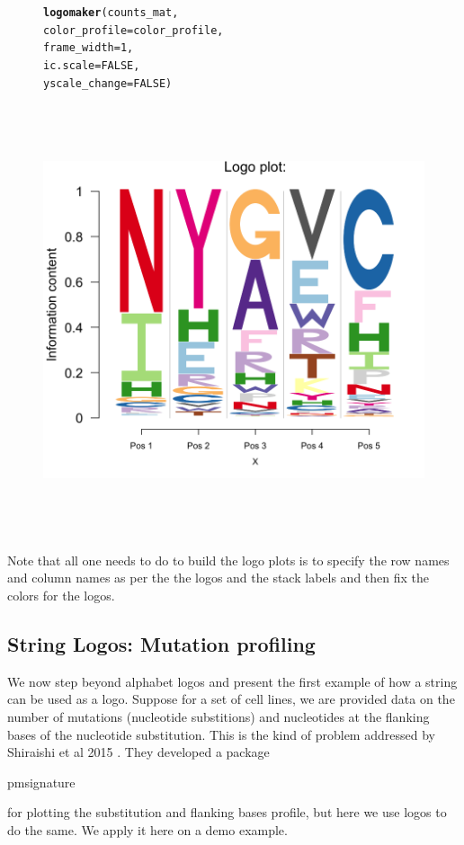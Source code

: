 \documentclass[12pt]{article}\usepackage[]{graphicx}\usepackage[usenames,dvipsnames]{color}
\makeatletter
\newcommand{\hlnum}[1]{\textcolor[rgb]{0.686,0.059,0.569}{#1}}%
\newcommand{\hlstd}[1]{\textcolor[rgb]{0.345,0.345,0.345}{#1}}%
\newcommand{\hlkwc}[1]{\textcolor[rgb]{0.333,0.667,0.333}{#1}}%
\newcommand{\hlkwd}[1]{\textcolor[rgb]{0.737,0.353,0.396}{\textbf{#1}}}%
\newenvironment{kframe}{%
 \def\at@end@of@kframe{}%
 \ifinner\ifhmode%
  \def\at@end@of@kframe{\end{minipage}}%
  \begin{minipage}{\columnwidth}%
 \fi\fi%
 \def\FrameCommand##1{\hskip\@totalleftmargin \hskip-\fboxsep
 \colorbox{shadecolor}{##1}\hskip-\fboxsep
     \hskip-\linewidth \hskip-\@totalleftmargin \hskip\columnwidth}%
 \MakeFramed {\advance\hsize-\width
   \@totalleftmargin\z@ \linewidth\hsize
   \@setminipage}}%
 {\par\unskip\endMakeFramed%
 \at@end@of@kframe}
\newenvironment{knitrout}{}{} %
\makeatother
\begin{document}
\begin{figure}[htp]
\begin{center}
\begin{knitrout}
\begin{kframe}
\begin{alltt}
\hlkwd{logomaker}\hlstd{(counts_mat,}
          \hlkwc{color_profile} \hlstd{= color_profile,}
          \hlkwc{frame_width} \hlstd{=} \hlnum{1}\hlstd{,}
          \hlkwc{ic.scale}  \hlstd{=} \hlnum{FALSE}\hlstd{,}
          \hlkwc{yscale_change} \hlstd{=} \hlnum{FALSE}\hlstd{)}
\end{alltt}
\end{kframe}
\includegraphics[width=6in,height=5in]{figure/logolas_use_5-1} 

\end{knitrout}
\end{center}
\end{figure}

Note that all one needs to do to build the logo plots is to specify the row names and column names as per the the logos and the stack labels and then fix the colors for the logos.

\newpage

\subsection{String Logos: Mutation profiling}

We now step beyond alphabet logos and present the first example of how a string can be used as a logo. Suppose for a set of cell lines, we are provided data on the number of mutations (nucleotide substitions) and nucleotides at the flanking bases of the nucleotide substitution. This is the kind of problem addressed by Shiraishi et al 2015 \cite{Shiraishi2015}. They developed a package \begin{verb} pmsignature \end{verb} for plotting the substitution and flanking bases profile, but here we use logos to do the same. We apply it here on a demo example.
\end{document}
